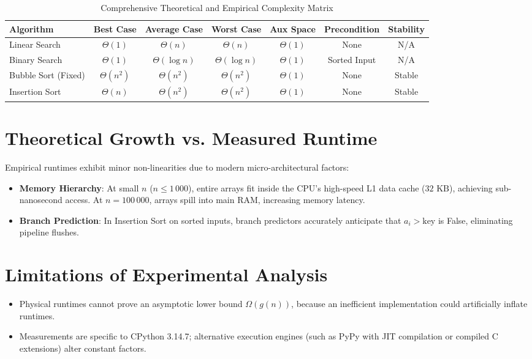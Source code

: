 \begin{table}[htbp]
\centering
\caption{Comprehensive Theoretical and Empirical Complexity Matrix}
\label{tab:complexity_comparison_matrix}
\small
\begin{tabular*}{\textwidth}{@{\extracolsep{\fill}}lcccccc}
\toprule
\textbf{Algorithm} & \textbf{Best Case} & \textbf{Average Case} & \textbf{Worst Case} & \textbf{Aux Space} & \textbf{Precondition} & \textbf{Stability} \\
\midrule
Linear Search & $\Theta(1)$ & $\Theta(n)$ & $\Theta(n)$ & $\Theta(1)$ & None & N/A \\
Binary Search & $\Theta(1)$ & $\Theta(\log n)$ & $\Theta(\log n)$ & $\Theta(1)$ & Sorted Input & N/A \\
Bubble Sort (Fixed) & $\Theta(n^2)$ & $\Theta(n^2)$ & $\Theta(n^2)$ & $\Theta(1)$ & None & Stable \\
Insertion Sort & $\Theta(n)$ & $\Theta(n^2)$ & $\Theta(n^2)$ & $\Theta(1)$ & None & Stable \\
\bottomrule
\end{tabular*}
\end{table}

\section{Theoretical Growth vs. Measured Runtime}
Empirical runtimes exhibit minor non-linearities due to modern micro-architectural factors:
\begin{itemize}
    \item \textbf{Memory Hierarchy}: At small $n$ ($n \le 1\,000$), entire arrays fit inside the CPU's high-speed L1 data cache ($32\text{ KB}$), achieving sub-nanosecond access. At $n = 100\,000$, arrays spill into main RAM, increasing memory latency.
    \item \textbf{Branch Prediction}: In Insertion Sort on sorted inputs, branch predictors accurately anticipate that $a_i > \text{key}$ is False, eliminating pipeline flushes.
\end{itemize}

\section{Limitations of Experimental Analysis}
\begin{itemize}
    \item Physical runtimes cannot prove an asymptotic lower bound $\Omega(g(n))$, because an inefficient implementation could artificially inflate runtimes.
    \item Measurements are specific to CPython 3.14.7; alternative execution engines (such as PyPy with JIT compilation or compiled C extensions) alter constant factors.
\end{itemize}

